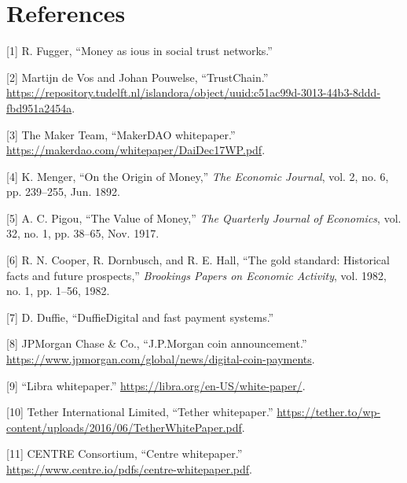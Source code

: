 \documentclass[english,]{IEEEtran}
\begin{document}
\hypertarget{references}{%
\section*{References}\label{references}}

\hypertarget{refs}{}
\leavevmode\hypertarget{ref-Money_as_IOUs_in_Social_Trust_Networks}{}%
{[}1{]} R. Fugger, ``Money as ious in social trust networks.''

\leavevmode\hypertarget{ref-TrustChain}{}%
{[}2{]} Martijn de Vos and Johan Pouwelse, ``TrustChain.''
\url{https://repository.tudelft.nl/islandora/object/uuid:c51ac99d-3013-44b3-8ddd-fbd951a2454a}.

\leavevmode\hypertarget{ref-MakerDAO:whitepaper}{}%
{[}3{]} The Maker Team, ``MakerDAO whitepaper.''
\url{https://makerdao.com/whitepaper/DaiDec17WP.pdf}.

\leavevmode\hypertarget{ref-On_the_Origin_of_Money}{}%
{[}4{]} K. Menger, ``On the Origin of Money,'' \emph{The Economic
Journal}, vol. 2, no. 6, pp. 239--255, Jun. 1892.

\leavevmode\hypertarget{ref-Value_of_Money}{}%
{[}5{]} A. C. Pigou, ``The Value of Money,'' \emph{The Quarterly Journal
of Economics}, vol. 32, no. 1, pp. 38--65, Nov. 1917.

\leavevmode\hypertarget{ref-The_Gold_Standard}{}%
{[}6{]} R. N. Cooper, R. Dornbusch, and R. E. Hall, ``The gold standard:
Historical facts and future prospects,'' \emph{Brookings Papers on
Economic Activity}, vol. 1982, no. 1, pp. 1--56, 1982.

\leavevmode\hypertarget{ref-DuffieDigital_and_Fast_Payment_Systems}{}%
{[}7{]} D. Duffie, ``DuffieDigital and fast payment systems.''

\leavevmode\hypertarget{ref-JPMorgan_Coin:whitepaper}{}%
{[}8{]} JPMorgan Chase \& Co., ``J.P.Morgan coin announcement.''
\url{https://www.jpmorgan.com/global/news/digital-coin-payments}.

\leavevmode\hypertarget{ref-Libra:whitepaper}{}%
{[}9{]} ``Libra whitepaper.''
\url{https://libra.org/en-US/white-paper/}.

\leavevmode\hypertarget{ref-Tether:whitepaper}{}%
{[}10{]} Tether International Limited, ``Tether whitepaper.''
\url{https://tether.to/wp-content/uploads/2016/06/TetherWhitePaper.pdf}.

\leavevmode\hypertarget{ref-Centre:whitepaper}{}%
{[}11{]} CENTRE Consortium, ``Centre whitepaper.''
\url{https://www.centre.io/pdfs/centre-whitepaper.pdf}.
\end{document}
